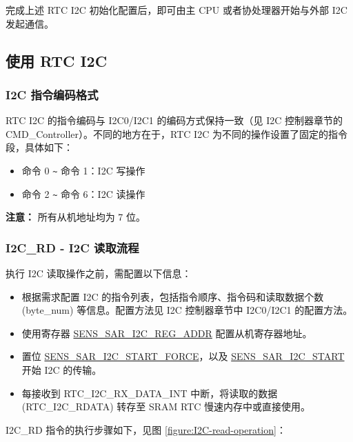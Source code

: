\documentclass[main\_\_CN.tex]{subfiles}
\begin{document}
完成上述 RTC I2C 初始化配置后，即可由主 CPU 或者协处理器开始与外部 I2C 发起通信。


\subsection{使用 RTC I2C}




\subsubsection{I2C 指令编码格式}

RTC I2C 的指令编码与 I2C0/I2C1 的编码方式保持一致（见 I2C 控制器章节的 CMD\_Controller）。不同的地方在于，RTC I2C 为不同的操作设置了固定的指令段，具体如下：
\begin{itemize}
    \item 命令 0 \verb+~+ 命令 1：I2C 写操作
    \item 命令 2 \verb+~+ 命令 6：I2C 读操作
\end{itemize}

\textbf{注意：}
所有从机地址均为 7 位。


\subsubsection{I2C\_RD - I2C 读取流程}

执行 I2C 读取操作之前，需配置以下信息：

\begin{itemize}
    \item 根据需求配置 I2C 的指令列表，包括指令顺序、指令码和读取数据个数 (byte\_num) 等信息。配置方法见 I2C 控制器章节中 I2C0/I2C1 的配置方法。
    \item 使用寄存器 \hyperref[fielddesc:SENSSARI2CREGADDR]{SENS\_SAR\_I2C\_REG\_ADDR} 配置从机寄存器地址。
    \item 置位 \hyperref[fielddesc:SENSSARI2CSTARTFORCE]{SENS\_SAR\_I2C\_START\_FORCE}，以及 \hyperref[fielddesc:SENSSARI2CSTART]{SENS\_SAR\_I2C\_START} 开始 I2C 的传输。
    \item 每接收到 RTC\_I2C\_RX\_DATA\_INT 中断，将读取的数据 (RTC\_I2C\_RDATA) 转存至 SRAM RTC 慢速内存中或直接使用。
\end{itemize}

I2C\_RD 指令的执行步骤如下，见图 \ref{figure:I2C-read-operation}：
\end{document}
